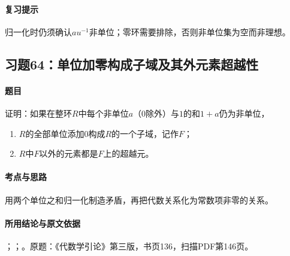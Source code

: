 \paragraph{复习提示}

归一化时仍须确认$au^{-1}$非单位；零环需要排除，否则非单位集为空而非理想。



\subsection{习题64：单位加零构成子域及其外元素超越性}

\label{ex:3:64}

\paragraph{题目}

证明：如果在整环$R$中每个非单位$a$（$0$除外）与$1$的和$1+a$仍为非单位，
\begin{enumerate}[label=(\roman*)]
\item $R$的全部单位添加$0$构成$R$的一个子域，记作$F$；
\item $R$中$F$以外的元素都是$F$上的超越元。
\end{enumerate}

\paragraph{考点与思路}

用两个单位之和归一化制造矛盾，再把代数关系化为常数项非零的关系。

\paragraph{所用结论与原文依据}

；；。原题：《代数学引论》第三版，书页136，扫描PDF第146页。


